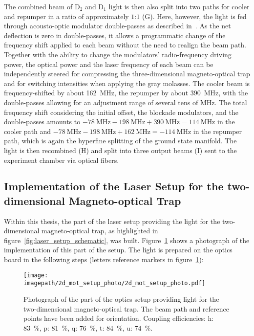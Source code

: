 The combined beam of D$_2$ and D$_1$ light is then also split into two paths for cooler and repumper in a ratio of approximately $1$:$1$ (G). Here, however, the light is fed through acousto-optic modulator double-passes as described in~\cite{qesja_notitle_2022}. As the net deflection is zero in double-passes, it allows a programmatic change of the frequency shift applied to each beam without the need to realign the beam path. Together with the ability to change the modulators' radio-frequency driving power, the optical power and the laser frequency of each beam can be independently steered for compressing the three-dimensional magneto-optical trap and for switching intensities when applying the gray molasses. The cooler beam is frequency-shifted by about \SI{+162}{\mega\hertz}, the repumper by about \SI{+390}{\mega\hertz}, with the double-passes allowing for an adjustment range of several tens of \si{\mega\hertz}. The total frequency shift considering the initial offset, the blockade modulators, and the double-passes amounts to $\SI{-78}{\mega\hertz} - \SI{198}{\mega\hertz} + \SI{390}{\mega\hertz} = \SI{+114}{\mega\hertz}$ in the cooler path and $\SI{-78}{\mega\hertz} - \SI{198}{\mega\hertz} + \SI{162}{\mega\hertz} = \SI{-114}{\mega\hertz}$ in the repumper path, which is again the hyperfine splitting of the ground state manifold. The light is then recombined (H) and split into three output beams (I) sent to the experiment chamber via optical fibers.

\subsection*{Implementation of the Laser Setup for the two-dimensional Magneto-optical Trap}
Within this thesis, the part of the laser setup providing the light for the two-dimensional magneto-optical trap, as highlighted in figure~\ref{fig:laser_setup_schematic}, was built.
Figure~\ref{fig:2d_mot_setup_photo} shows a photograph of the implementation of this part of the setup. The light is prepared on the optics board in the following steps (letters reference markers in figure~\ref{fig:2d_mot_setup_photo}):

\begin{figure}
    \centering
    \texttt{[image: \\imagepath/2d\_mot\_setup\_photo/2d\_mot\_setup\_photo.pdf]}
    \caption{Photograph of the part of the optics setup providing light for the two-dimensional magneto-optical trap. The beam path and reference points have been added for orientation. Coupling efficiencies: h: \SI[]{83}{\percent}, p: \SI[]{81}{\percent}, q: \SI[]{76}{\percent}, t: \SI[]{84}{\percent}, u: \SI[]{74}{\percent}.}
    \label{fig:2d_mot_setup_photo}
\end{figure}

